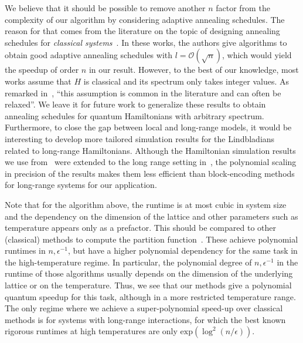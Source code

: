 \documentclass[aps,pra,amsmath,amssymb,twocolumn,10pt]{revtex4-2}
\theoremstyle{definition}
\begin{document}
We believe that it should be possible to remove another $n$ factor from the complexity of our algorithm by considering adaptive annealing schedules.
The reason for that comes from the literature on the topic of designing annealing schedules for \emph{classical systems}~\cite{Arunachalam2022,Stefankovic2007,Harrow2020,Huber2015,pmlr-v75-kolmogorov18a,Montanaro2015,Bezkov2008,hamoudi_magniez,Cornelissen2023}. In these works, the authors give algorithms to obtain good adaptive annealing schedules with $l=\mathcal{O}(\sqrt{n})$, which would yield the speedup of order $n$ in our result. However, to the best of our knowledge, most works assume that $H$ is classical and its spectrum only takes integer values. As remarked in~\cite[Footnote 1]{Arunachalam2022}, ``this assumption is common in the literature and can often be relaxed''. We leave it for future work to generalize these results to obtain annealing schedules for quantum Hamiltonians with arbitrary spectrum. Furthermore, to close the gap between local and long-range models, it would be interesting to develop more tailored simulation results for the Lindbladians related to long-range Hamiltonians. Although the Hamiltonian simulation results we use from~\cite{Haah_2021} were extended to the long range setting in~\cite{TranLong19}, the polynomial scaling in precision of the results makes them less efficient than block-encoding methods for long-range systems for our application.

Note that for the algorithm  above, the runtime is at most cubic in system size and the dependency on the dimension of the lattice and other parameters such as temperature appears only as a prefactor.
This should be compared to other (classical) methods to compute the partition function~\cite{Mann2021,Harrow2020b,Haah_2024}. These achieve polynomial runtimes in $n,\epsilon^{-1}$, but have a higher polynomial dependency  for the same task in the high-temperature regime. In particular, the polynomial degree of $n,\epsilon^{-1}$ in the runtime of those algorithms usually depends on the dimension of the underlying lattice or on the temperature. Thus, we see that our methods give a polynomial quantum speedup for this task, although in a more restricted temperature range. The only regime where we achieve a super-polynomial speed-up over classical methods is for systems with long-range interactions, for which the best known rigorous runtimes at high temperatures are only $\text{exp}({\log^2(n/\epsilon)})$\cite{sanchezsegovia2025hightemperature}.
\end{document}

